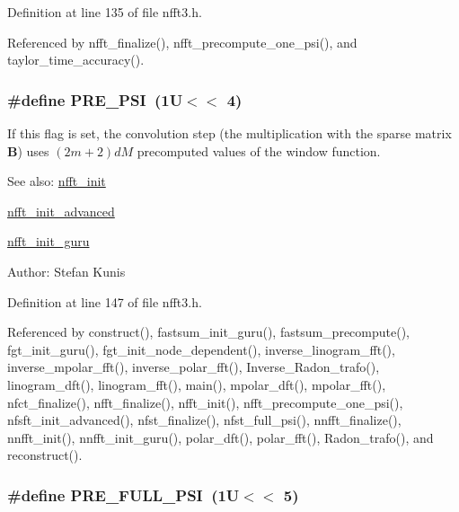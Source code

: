 Definition at line 135 of file nfft3.h.

Referenced by nfft\_\-finalize(), nfft\_\-precompute\_\-one\_\-psi(), and taylor\_\-time\_\-accuracy().\hypertarget{group__nfft_ga20}{
\subsubsection[PRE\_\-PSI]{\setlength{\rightskip}{0pt plus 5cm}\#define PRE\_\-PSI~(1U$<$$<$ 4)}}
\label{group__nfft_ga20}


If this flag is set, the convolution step (the multiplication with the sparse matrix $\mathbf{B}$) uses $(2m+2)dM$ precomputed values of the window function. 

\begin{Desc}
\item[See also:]\hyperlink{group__nfft_ga7}{nfft\_\-init} 

\hyperlink{group__nfft_ga8}{nfft\_\-init\_\-advanced} 

\hyperlink{group__nfft_ga9}{nfft\_\-init\_\-guru} \end{Desc}
\begin{Desc}
\item[Author:]Stefan Kunis \end{Desc}


Definition at line 147 of file nfft3.h.

Referenced by construct(), fastsum\_\-init\_\-guru(), fastsum\_\-precompute(), fgt\_\-init\_\-guru(), fgt\_\-init\_\-node\_\-dependent(), inverse\_\-linogram\_\-fft(), inverse\_\-mpolar\_\-fft(), inverse\_\-polar\_\-fft(), Inverse\_\-Radon\_\-trafo(), linogram\_\-dft(), linogram\_\-fft(), main(), mpolar\_\-dft(), mpolar\_\-fft(), nfct\_\-finalize(), nfft\_\-finalize(), nfft\_\-init(), nfft\_\-precompute\_\-one\_\-psi(), nfsft\_\-init\_\-advanced(), nfst\_\-finalize(), nfst\_\-full\_\-psi(), nnfft\_\-finalize(), nnfft\_\-init(), nnfft\_\-init\_\-guru(), polar\_\-dft(), polar\_\-fft(), Radon\_\-trafo(), and reconstruct().\hypertarget{group__nfft_ga21}{
\subsubsection[PRE\_\-FULL\_\-PSI]{\setlength{\rightskip}{0pt plus 5cm}\#define PRE\_\-FULL\_\-PSI~(1U$<$$<$ 5)}}
\label{group__nfft_ga21}


